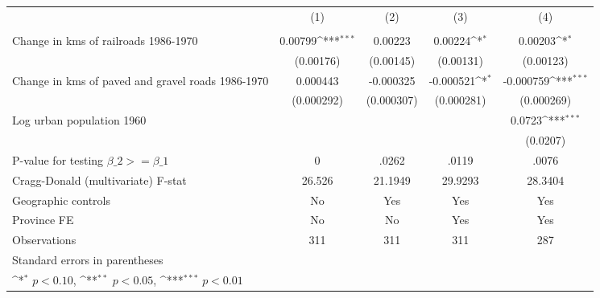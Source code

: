 {
\def\sym#1{\ifmmode^{#1}\else\(^{#1}\)\fi}
\begin{tabular}{l*{4}{c}}
\hline\hline
                &\multicolumn{1}{c}{(1)}&\multicolumn{1}{c}{(2)}&\multicolumn{1}{c}{(3)}&\multicolumn{1}{c}{(4)}\\
                &\multicolumn{1}{c}{}&\multicolumn{1}{c}{}&\multicolumn{1}{c}{}&\multicolumn{1}{c}{}\\
\hline
Change in kms of railroads 1986-1970&  0.00799\sym{***}&  0.00223         &  0.00224\sym{*}  &  0.00203\sym{*}  \\
                &(0.00176)         &(0.00145)         &(0.00131)         &(0.00123)         \\
[1em]
Change in kms of paved and gravel roads 1986-1970& 0.000443         &-0.000325         &-0.000521\sym{*}  &-0.000759\sym{***}\\
                &(0.000292)         &(0.000307)         &(0.000281)         &(0.000269)         \\
[1em]
Log urban population 1960&                  &                  &                  &   0.0723\sym{***}\\
                &                  &                  &                  & (0.0207)         \\
\hline
P-value for testing $\beta\_{2} >= \beta\_{1}$&        0         &    .0262         &    .0119         &    .0076         \\
Cragg-Donald (multivariate) F-stat&   26.526         &  21.1949         &  29.9293         &  28.3404         \\
Geographic controls&       No         &      Yes         &      Yes         &      Yes         \\
Province FE     &       No         &       No         &      Yes         &      Yes         \\
Observations    &      311         &      311         &      311         &      287         \\
\hline\hline
\multicolumn{5}{l}{\footnotesize Standard errors in parentheses}\\
\multicolumn{5}{l}{\footnotesize \sym{*} \(p<0.10\), \sym{**} \(p<0.05\), \sym{***} \(p<0.01\)}\\
\end{tabular}
}
